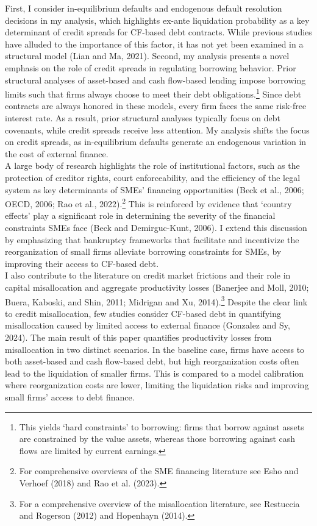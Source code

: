 \documentclass[12pt]{article}
\begin{document}
First, I consider in-equilibrium defaults and endogenous default resolution decisions in my analysis, which highlights ex-ante liquidation probability as a key determinant of credit spreads for CF-based debt contracts. While previous studies have alluded to the importance of this factor, it has not yet been examined in a structural model (Lian and Ma, 2021). Second, my analysis presents a novel emphasis on the role of credit spreads in regulating borrowing behavior. Prior structural analyses of asset-based and cash flow-based lending impose borrowing limits such that firms always choose to meet their debt obligations.\footnote{This yields `hard constraints' to borrowing: firms that borrow against assets are constrained by the value assets, whereas those borrowing against cash flows are limited by current earnings.} Since debt contracts are always honored in these models, every firm faces the same risk-free interest rate. As a result, prior structural analyses typically focus on debt covenants, while credit spreads receive less attention. My analysis shifts the focus on credit spreads, as in-equilibrium defaults generate an endogenous variation in the cost of external finance. \vspace{3mm} \\
A large body of research highlights the role of institutional factors, such as the protection of creditor rights, court enforceability, and the efficiency of the legal system as key determinants of SMEs' financing opportunities (Beck et al., 2006; OECD, 2006; Rao et al., 2022).\footnote{For comprehensive overviews of the SME financing literature see Esho and Verhoef (2018) and Rao et al. (2023).} This is reinforced by evidence that `country effects' play a significant role in determining the severity of the financial constraints SMEs face (Beck and Demirguc-Kunt, 2006). I extend this discussion by emphasizing that bankruptcy frameworks that facilitate and incentivize the reorganization of small firms alleviate borrowing constraints for SMEs, by improving their access to CF-based debt. \vspace{3mm} \\
I also contribute to the literature on credit market frictions and their role in capital misallocation and aggregate productivity losses (Banerjee and Moll, 2010; Buera, Kaboski, and Shin, 2011; Midrigan and Xu, 2014).\footnote{For a comprehensive overview of the misallocation literature, see Restuccia and Rogerson (2012) and Hopenhayn (2014).} Despite the clear link to credit misallocation, few studies consider CF-based debt in quantifying misallocation caused by limited access to external finance (Gonzalez and Sy, 2024). The main result of this paper quantifies productivity losses from misallocation in two distinct scenarios. In the baseline case, firms have access to both asset-based and cash flow-based debt, but high reorganization costs often lead to the liquidation of smaller firms. This is compared to a model calibration where reorganization costs are lower, limiting the liquidation risks and improving small firms' access to debt finance. 
\end{document}
